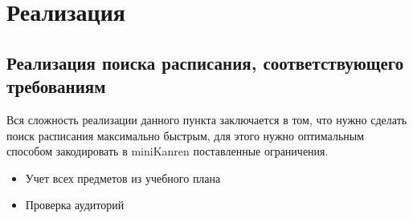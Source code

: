 

%


% 








\section{Реализация}
\subsection{Реализация поиска расписания, соответствующего требованиям}
Вся сложность реализации данного пункта заключается в том, что нужно сделать поиск расписания максимально быстрым, для этого нужно оптимальным способом закодировать в miniKanren поставленные ограничения.
\begin{itemize}
    \item Учет всех предметов из учебного плана
    \item Проверка аудиторий
\end{itemize}
